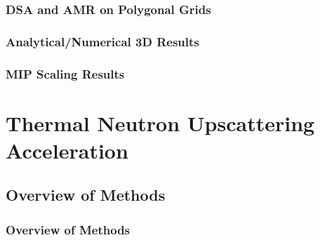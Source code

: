\documentclass[compress,10pt]{beamer}
\begin{document}
\begin{frame}[t]\frametitle{DSA and AMR on Polygonal Grids}

\end{frame}
\begin{frame}[t]\frametitle{Analytical/Numerical 3D Results}

\end{frame}
\begin{frame}[t]\frametitle{MIP Scaling Results}

\end{frame}
\typeout{***********************************************************************************}
\section[Upscattering Acceleration]{Thermal Neutron Upscattering Acceleration}
\subsection{Overview of Methods}
\begin{frame}[t]\frametitle{Overview of Methods}

\end{frame}
\end{document}

